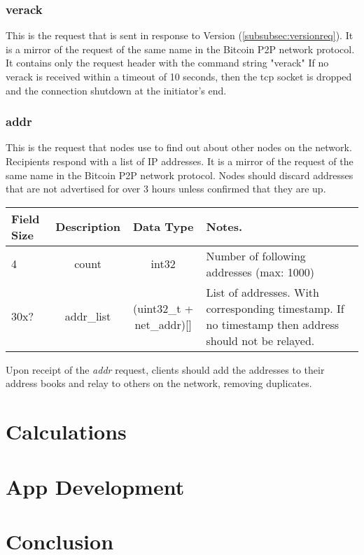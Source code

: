 \documentclass{article}
\begin{document}
\subsubsection{verack}
\label{subsubsec:verackreq}
This is the request that is sent in response to Version (\ref{subsubsec:versionreq}). It is a mirror of the request of the same name in the Bitcoin P2P network protocol. It contains only the request header with the command string "verack"
\newline\newline
If no verack is received within a timeout of 10 seconds, then the tcp socket is dropped and the connection shutdown at the initiator's end.

\subsubsection{addr}
\label{subsubsec:addrreq}
This is the request that nodes use to find out about other nodes on the network. Recipients respond with a list of IP addresses. It is a mirror of the request of the same name in the Bitcoin P2P network protocol.
\newline\newline
Nodes should discard addresses that are not advertised for over 3 hours unless confirmed that they are up.

\begin{center}
\begin{tabular}{ ||l|c|c|p{5cm}|| }
\hline
 Field Size & Description & Data Type & Notes. \\ 
\hline\hline
\rowcolor{g}
 4 & count & int32 & Number of following addresses (max: 1000) \\
\rowcolor{g}
 30x? & addr\_list & (uint32\_t + net\_addr)[] & List of addresses. With corresponding timestamp. If no timestamp then address should not be relayed. \\
\hline
\end{tabular}
\end{center}
Upon receipt of the \textit{addr} request, clients should add the addresses to their address books and relay to others on the network, removing duplicates.

\section{Calculations}

\section{App Development}


\section{Conclusion}
\end{document}
